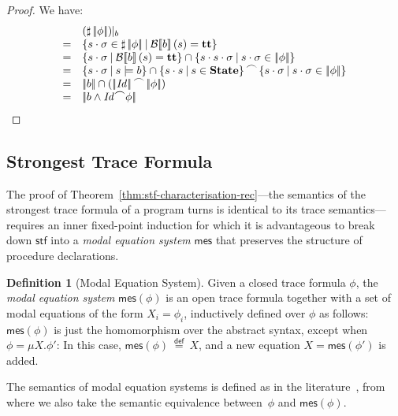 \documentclass[10pt,a4paper]{amsart}
\newtheorem{proposition}[theorem]{Proposition}
\theoremstyle{definition}
\newtheorem{definition}[theorem]{Definition}
\newcommand{\defeq}{\stackrel{\mathsf{def}}{=}}
\newcommand{\setdef}[2]{\left\{ #1 \>\middle|\> #2 \right\}}
\newcommand{\denot}[1]{\left[\!\left[#1\right]\!\right]}
\newcommand{\fdenot}[1]{\left|\!\left|#1\right|\!\right|}
\newcommand{\bexdenot}[1]{\mathcal{B}\!\denot{#1}}
\newcommand{\chop}[0]{\raisebox{1ex}{$\frown$}}
\newcommand{\mes}[1]{\mathsf{mes} (#1)}
\newcommand{\ttt}{\mbox{\bf tt}}
\newcommand{\State}{\mbox{\bf State}}
\begin{document}
\begin{proof}%
We have:
  \[
    \begin{array}{cl}
    & (\sharp\fdenot{\phi})\!\!\mid_b\\
    = & \setdef{s \cdot \sigma \in \sharp\fdenot{\phi}}{\bexdenot{b} (s) = \ttt} \\
    = & \setdef{s \cdot \sigma }{\bexdenot{b} (s) = \ttt} \cap\setdef{s \cdot s \cdot \sigma }{s\cdot\sigma\in\fdenot{\phi}}\\
    = & \setdef{s \cdot \sigma }{s\models b} \cap\setdef{s \cdot s}{s\in\State}\chop\setdef{s \cdot \sigma }{s\cdot\sigma\in\fdenot{\phi}}\\
    = & \fdenot{b} \cap(\fdenot{\mathit{Id}}\chop\fdenot{\phi})\\
    = & \fdenot{b\land\mathit{Id}\chop\phi}
    \end{array}
  \]%
\end{proof}

\subsection{Strongest Trace Formula}
\label{sec:stf-app}

The proof of Theorem~\ref{thm:stf-characterisation-rec}---the
semantics of the strongest trace formula of a program turns is
identical to its trace semantics---requires an inner fixed-point
induction for which it is advantageous to break down $\mathsf{stf}$
into a \emph{modal equation system} $\mathsf{mes}$ \cite{Mader97} that
preserves the structure of procedure declarations.

\begin{definition}[Modal Equation System]
\label{def:meq}
  Given a closed trace formula $\phi$, the \emph{modal equation
  system} $\mes{\phi}$ is an open trace formula together with a set
  of modal equations of the form $X_i=\phi_i$, inductively defined
  over $\phi$ as follows: $\mes{\phi}$ is just the homomorphism over
  the abstract syntax, except when $\phi=\mu X.\phi'$: In this case,
  $\mes{\phi} \>\defeq\> X$, and a new equation $X=\mes{\phi'}$ is
  added.
\end{definition}

The semantics of modal equation systems is defined as in the
literature~\cite{Mader97}, from where we also take the semantic
equivalence between~$\phi$ and $\mes{\phi}$.
%
\end{document}
